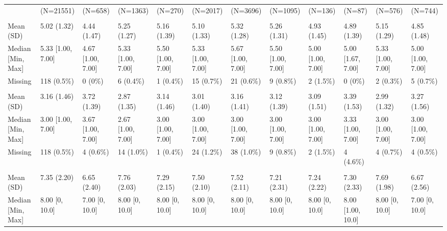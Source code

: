 \documentclass[
  single column]{article}
\begin{document}
\begin{landscape}
\begin{longtable}[t]{llllllllllll}
\endfoot
\bottomrule
\endlastfoot
 & (N=21551) & (N=658) & (N=1363) & (N=270) & (N=2017) & (N=3696) & (N=1095) & (N=136) & (N=87) & (N=576) & (N=744)\\
\addlinespace[0.3em]
\multicolumn{12}{l}{\textbf{Forgiveness}}\\
\hspace{1em}Mean (SD) & 5.02 (1.32) & 4.44 (1.47) & 5.25 (1.27) & 5.16 (1.39) & 5.10 (1.33) & 5.32 (1.28) & 5.26 (1.31) & 4.93 (1.45) & 4.89 (1.39) & 5.15 (1.29) & 4.85 (1.48)\\
\hspace{1em}Median [Min, Max] & 5.33 [1.00, 7.00] & 4.67 [1.00, 7.00] & 5.33 [1.00, 7.00] & 5.50 [1.00, 7.00] & 5.33 [1.00, 7.00] & 5.67 [1.00, 7.00] & 5.50 [1.00, 7.00] & 5.00 [1.00, 7.00] & 5.00 [1.67, 7.00] & 5.33 [1.00, 7.00] & 5.00 [1.00, 7.00]\\
\hspace{1em}Missing & 118 (0.5\%) & 0 (0\%) & 6 (0.4\%) & 1 (0.4\%) & 15 (0.7\%) & 21 (0.6\%) & 9 (0.8\%) & 2 (1.5\%) & 0 (0\%) & 2 (0.3\%) & 5 (0.7\%)\\
\addlinespace[0.3em]
\multicolumn{12}{l}{\textbf{Perfectionism}}\\
\hspace{1em}Mean (SD) & 3.16 (1.46) & 3.72 (1.39) & 2.87 (1.35) & 3.14 (1.46) & 3.01 (1.40) & 3.16 (1.41) & 3.12 (1.39) & 3.09 (1.51) & 3.39 (1.53) & 2.99 (1.32) & 3.27 (1.56)\\
\hspace{1em}Median [Min, Max] & 3.00 [1.00, 7.00] & 3.67 [1.00, 7.00] & 2.67 [1.00, 7.00] & 3.00 [1.00, 7.00] & 3.00 [1.00, 7.00] & 3.00 [1.00, 7.00] & 3.00 [1.00, 7.00] & 3.00 [1.00, 7.00] & 3.33 [1.00, 7.00] & 3.00 [1.00, 7.00] & 3.00 [1.00, 7.00]\\
\hspace{1em}Missing & 118 (0.5\%) & 4 (0.6\%) & 14 (1.0\%) & 1 (0.4\%) & 24 (1.2\%) & 38 (1.0\%) & 9 (0.8\%) & 2 (1.5\%) & 4 (4.6\%) & 4 (0.7\%) & 4 (0.5\%)\\
\addlinespace[0.3em]
\multicolumn{12}{l}{\textbf{PWB Standard Living}}\\
\hspace{1em}Mean (SD) & 7.35 (2.20) & 6.65 (2.40) & 7.76 (2.03) & 7.29 (2.15) & 7.50 (2.10) & 7.52 (2.11) & 7.21 (2.31) & 7.24 (2.22) & 7.30 (2.33) & 7.69 (1.98) & 6.67 (2.56)\\
\hspace{1em}Median [Min, Max] & 8.00 [0, 10.0] & 7.00 [0, 10.0] & 8.00 [0, 10.0] & 8.00 [0, 10.0] & 8.00 [0, 10.0] & 8.00 [0, 10.0] & 8.00 [0, 10.0] & 8.00 [0, 10.0] & 8.00 [1.00, 10.0] & 8.00 [0, 10.0] & 7.00 [0, 10.0]\\

\end{longtable}
\end{landscape}
\end{document}
